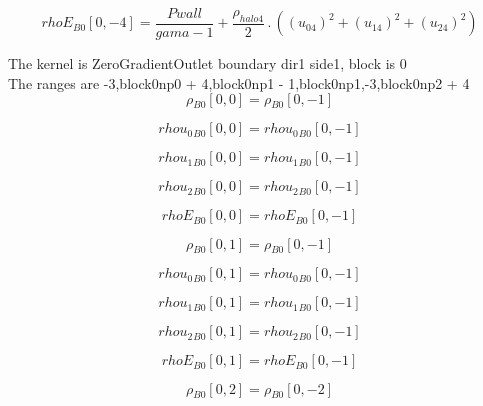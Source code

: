 \documentclass{article}
\begin{document}
\begin{dmath}{rhoE{_{B0}}}[{0,-4}] = \frac{Pwall}{gama - 1} + \frac{\rho_{halo 4}}{2} \,.\, \left(\left(u_{04} \right)^{2} + \left(u_{14} \right)^{2} + \left(u_{24} \right)^{2}\right)\end{dmath}

\noindent The kernel is ZeroGradientOutlet boundary dir1 side1, block is 0\\\noindent The ranges are -3,block0np0 + 4,block0np1 - 1,block0np1,-3,block0np2 + 4\\\begin{dmath}{\rho{_{B0}}}[{0,0}] = {\rho{_{B0}}}[{0,-1}]\end{dmath}

\begin{dmath}{rhou_{0}{_{B0}}}[{0,0}] = {rhou_{0}{_{B0}}}[{0,-1}]\end{dmath}

\begin{dmath}{rhou_{1}{_{B0}}}[{0,0}] = {rhou_{1}{_{B0}}}[{0,-1}]\end{dmath}

\begin{dmath}{rhou_{2}{_{B0}}}[{0,0}] = {rhou_{2}{_{B0}}}[{0,-1}]\end{dmath}

\begin{dmath}{rhoE{_{B0}}}[{0,0}] = {rhoE{_{B0}}}[{0,-1}]\end{dmath}

\begin{dmath}{\rho{_{B0}}}[{0,1}] = {\rho{_{B0}}}[{0,-1}]\end{dmath}

\begin{dmath}{rhou_{0}{_{B0}}}[{0,1}] = {rhou_{0}{_{B0}}}[{0,-1}]\end{dmath}

\begin{dmath}{rhou_{1}{_{B0}}}[{0,1}] = {rhou_{1}{_{B0}}}[{0,-1}]\end{dmath}

\begin{dmath}{rhou_{2}{_{B0}}}[{0,1}] = {rhou_{2}{_{B0}}}[{0,-1}]\end{dmath}

\begin{dmath}{rhoE{_{B0}}}[{0,1}] = {rhoE{_{B0}}}[{0,-1}]\end{dmath}

\begin{dmath}{\rho{_{B0}}}[{0,2}] = {\rho{_{B0}}}[{0,-2}]\end{dmath}
\end{document}
